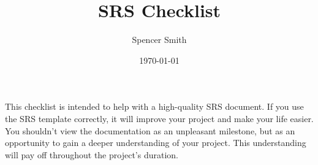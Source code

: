 \documentclass[12pt]{article}
\newcommand{\cmark}{\ding{51}}%
\newcommand{\xmark}{\ding{55}}%
\newcommand{\done}{\rlap{$\square$}{\raisebox{2pt}{\large\hspace{1pt}\cmark}}%
\hspace{-2.5pt}}
\newcommand{\wontfix}{\rlap{$\square$}{\large\hspace{1pt}\xmark}}
\begin{document}
\title{SRS Checklist}
\author{Spencer Smith}
\date{\today}

\maketitle


This checklist is intended to help with a high-quality SRS document. If you use
the SRS template correctly, it will improve your project and make your life
easier.  You shouldn't view the documentation as an unpleasant milestone, but as
an opportunity to gain a deeper understanding of your project. This
understanding will pay off throughout the project's duration.
\end{document}
